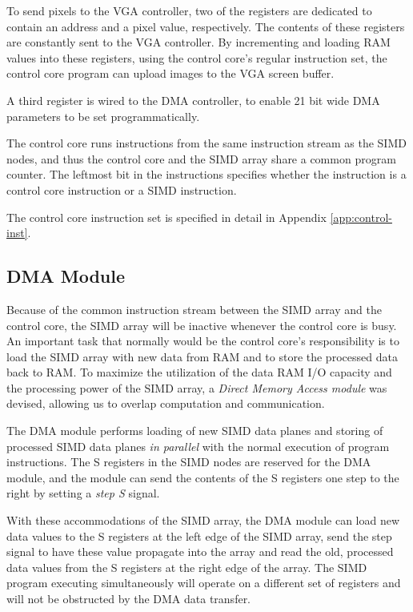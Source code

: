 
To send pixels to the \ac{VGA} controller, two of the registers are dedicated to
contain an address and a pixel value, respectively. The contents of these
registers are constantly sent to the \ac{VGA} controller. By incrementing and
loading \ac{RAM} values into these registers, using the control core's regular
instruction set, the control core program can upload images to the \ac{VGA}
screen buffer.

A third register is wired to the \ac{DMA} controller, to enable 21 bit wide
\ac{DMA} parameters to be set programmatically.

The control core runs instructions from the same instruction stream as the
\ac{SIMD} nodes, and thus the control core and the \ac{SIMD} array share a
common program counter. The leftmost bit in the instructions specifies whether
the instruction is a control core instruction or a \ac{SIMD} instruction.

The control core instruction set is specified in detail in Appendix
\ref{app:control-inst}.

\subsection{DMA Module}

Because of the common instruction stream between the \ac{SIMD} array and the
control core, the \ac{SIMD} array will be inactive whenever the control core is
busy. An important task that normally would be the control core's responsibility
is to load the \ac{SIMD} array with new data from \ac{RAM} and to store the
processed data back to \ac{RAM}. To maximize the utilization of the data
\ac{RAM} \ac{I/O} capacity and the processing power of the \ac{SIMD} array, a
\emph{Direct Memory Access module} was devised, allowing us to overlap
computation and communication.

The \ac{DMA} module performs loading of new \ac{SIMD} data planes and storing of
processed \ac{SIMD} data planes \emph{in parallel} with the normal execution of
program instructions. The S registers in the \ac{SIMD} nodes are reserved for
the \ac{DMA} module, and the module can send the contents of the S registers one
step to the right by setting a \emph{step S} signal.

With these accommodations of the \ac{SIMD} array, the \ac{DMA} module can load
new data values to the S registers at the left edge of the \ac{SIMD} array, send
the step signal to have these value propagate into the array and read the old,
processed data values from the S registers at the right edge of the array. The
\ac{SIMD} program executing simultaneously will operate on a different set of
registers and will not be obstructed by the \ac{DMA} data transfer.


